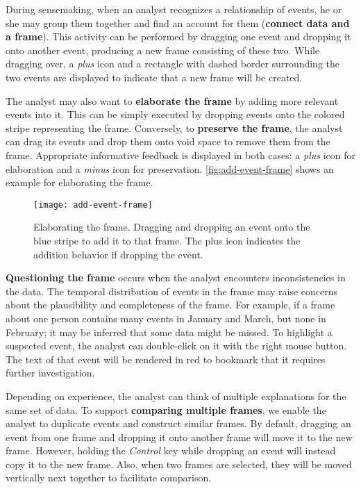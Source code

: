 During sensemaking, when an analyst recognizes a relationship of events, he or she may group them together and find an account for them (\textbf{connect data and a frame}). This activity can be performed by dragging one event and dropping it onto another event, producing a new frame consisting of these two. While dragging over, a \emph{plus} icon and a rectangle with dashed border surrounding the two events are displayed to indicate that a new frame will be created. 

The analyst may also want to \textbf{elaborate the frame} by adding more relevant events into it. This can be simply executed by dropping events onto the colored stripe representing the frame. Conversely, to \textbf{preserve the frame}, the analyst can drag its events and drop them onto void space to remove them from the frame. Appropriate informative feedback is displayed in both cases: a \emph{plus} icon for elaboration and a \emph{minus} icon for preservation. \autoref{fig:add-event-frame} shows an example for elaborating the frame.

\begin{figure}[!htb]
	\centering
	\texttt{[image: add-event-frame]}
	\caption{Elaborating the frame. Dragging and dropping an event onto the blue stripe to add it to that frame. The plus icon indicates the addition behavior if dropping the event.}
	\label{fig:add-event-frame}
\end{figure}

\textbf{Questioning the frame} occurs when the analyst encounters inconsistencies in the data. The temporal distribution of events in the frame may raise concerns about the plausibility and completeness of the frame. For example, if a frame about one person contains many events in January and March, but none in February; it may be inferred that some data might be missed. To highlight a suspected event, the analyst can double-click on it with the right mouse button. The text of that event will be rendered in red to bookmark that it requires further investigation. 

Depending on experience, the analyst can think of multiple explanations for the same set of data. To support \textbf{comparing multiple frames}, we enable the analyst to duplicate events and construct similar frames. By default, dragging an event from one frame and dropping it onto another frame will move it to the new frame. However, holding the \emph{Control} key while dropping an event will instead copy it to the new frame. Also, when two frames are selected, they will be moved vertically next together to facilitate comparison.


